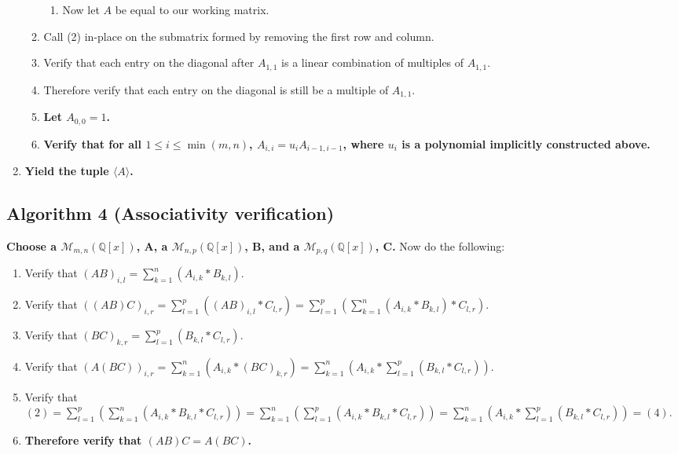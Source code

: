 \documentclass[twocolumn]{article}
\begin{document}
\begin{enumerate}
\begin{enumerate}
\begin{enumerate}
						\item Now let $A$ be equal to our working matrix.
					\end{enumerate}
					\item Call (2) in-place on the submatrix formed by removing the first row and column.
					\item Verify that each entry on the diagonal after $A_{1,1}$ is a linear combination of multiples of $A_{1,1}$.
					\item Therefore verify that each entry on the diagonal is still be a multiple of $A_{1,1}$.
					\item \textbf{Let $A_{0,0}=1$.}
					\item \textbf{Verify that for all $1\le i\le\min(m,n)$, $A_{i,i}=u_iA_{i-1,i-1}$, where $u_i$ is a polynomial implicitly constructed above.}
				\end{enumerate}
				\item \textbf{Yield the tuple $\langle A\rangle$.}
			\end{enumerate}
		\subsection{Algorithm 4 (Associativity verification)}\label{sec:algorithm 4}
			\textbf{Choose a $\mathcal{M}_{m,n}(\mathbb{Q}[x])$, A, a $\mathcal{M}_{n,p}(\mathbb{Q}[x])$, B, and a $\mathcal{M}_{p,q}(\mathbb{Q}[x])$, C.} Now do the following:
			\begin{enumerate}
				\item Verify that $(AB)_{i,l}=\sum_{k=1}^{n} \left(A_{i,k}*B_{k,l}\right)$.
				\item Verify that $((AB)C)_{i,r}=\sum_{l=1}^{p} \left((AB)_{i,l}*C_{l,r}\right)=\sum_{l=1}^{p} \left(\sum_{k=1}^{n} \left(A_{i,k}*B_{k,l}\right)*C_{l,r}\right)$.
				\item Verify that $(BC)_{k,r}=\sum_{l=1}^{p}\left(B_{k,l}*C_{l,r}\right)$.
				\item Verify that $(A(BC))_{i,r}=\sum_{k=1}^{n}\left(A_{i,k}*(BC)_{k,r}\right)=\sum_{k=1}^{n}\left(A_{i,k}*\sum_{l=1}^{p}\left(B_{k,l}*C_{l,r}\right)\right)$.
				\item Verify that $(2)=\sum_{l=1}^{p} \left(\sum_{k=1}^{n} \left(A_{i,k}*B_{k,l}*C_{l,r}\right)\right)=\sum_{k=1}^{n} \left(\sum_{l=1}^{p} \left(A_{i,k}*B_{k,l}*C_{l,r}\right)\right)=\sum_{k=1}^{n}\left(A_{i,k}*\sum_{l=1}^{p}\left(B_{k,l}*C_{l,r}\right)\right)=(4)$.
				\item \textbf{Therefore verify that $(AB)C=A(BC)$.}
			\end{enumerate}
\end{document}

